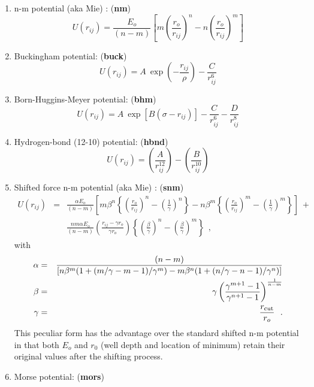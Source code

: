 \begin{enumerate}
\item n-m potential (aka Mie) \cite{mie-03a,clarke-86a}:  ({\bf nm})
\begin{equation}
U(r_{ij}) = \frac{E_{o}}{(n-m)}\left[m\left
(\frac{r_{o}}{r_{ij}}\right)^{n}-n\left(\frac{r_{o}}{r_{ij}}\right)^{m}\right]
\end{equation}
\item Buckingham potential:  ({\bf buck})
\begin{equation}
U(r_{ij}) =
A~\exp\left(-\frac{r_{ij}}{\rho}\right)-\frac{C}{r_{ij}^{6}}
\end{equation}
\item Born-Huggins-Meyer potential:  ({\bf bhm})
\begin{equation}
U(r_{ij}) =
A~\exp[B(\sigma-r_{ij})]-\frac{C}{r_{ij}^{6}}-\frac{D}{r_{ij}^{8}}
\end{equation}
\item Hydrogen-bond (12-10) potential:  ({\bf hbnd})
\begin{equation}
U(r_{ij}) =
\left(\frac{A}{r_{ij}^{12}}\right)-\left(\frac{B}{r_{ij}^{10}}\right)
\end{equation}
\item Shifted force n-m potential (aka Mie) \cite{mie-03a,clarke-86a}:  ({\bf snm})
\begin{eqnarray}
U(r_{ij})&=&\frac{\alpha E_{o}}{(n-m)}\left [
m\beta^{n}\left \{ \left (\frac{r_{o}}{r_{ij}}\right )^{n}-
\left(\frac{1}{\gamma}\right)^{n}\right \}-
n\beta^{m}\left \{ \left (\frac{r_{o}}{r_{ij}}\right )^{m}-
\left(\frac{1}{\gamma}\right)^{m}\right \} \right ]~+~\phantom{xxxx} \nonumber \\
& & \frac{nm\alpha E_{o}}{(n-m)} \left ( \frac{r_{ij}-\gamma r_{o}}{\gamma r_{o}}
\right )\left\{\left(\frac{\beta}{\gamma}\right
)^{n}-\left(\frac{\beta}{\gamma}\right )^{m}\right \}~~,
\end{eqnarray}
with
\begin{eqnarray}
\alpha&=&\frac{(n-m)}{[n\beta^{m}(1+(m/\gamma-m-1)/\gamma^{m})-
m\beta^{n}(1+(n/\gamma-n-1)/\gamma^{n})]} \nonumber \\
\beta &=& \gamma\left( \frac{\gamma^{m+1}-1}{\gamma^{n+1}-1}
\right)^{\frac{1}{n-m}} \\
\gamma &=& \frac{r_{\rm cut}}{r_{o}}~~. \nonumber
\end{eqnarray}
This peculiar form has the advantage over the standard shifted n-m
potential in that both $E_{o}$ and $r_{0}$ (well depth and location of
minimum) retain their original values after the shifting process.
\item Morse potential:  ({\bf mors})

\end{enumerate}
